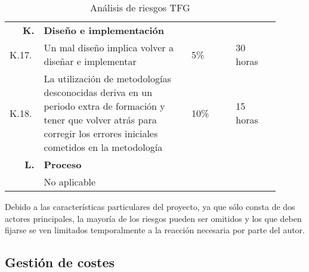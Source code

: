 \begin{table}[H]
\begin{tabular}{p{0.1\linewidth}p{0.5\linewidth}p{0.15\linewidth}p{0.15\linewidth}}
		\multicolumn{1}{r}{\cellcolor{black!30}\textbf{K. }} &
		\multicolumn{3}{l}{\cellcolor{black!30}\textbf{Diseño e implementación}}\\
		K.17. &Un mal diseño implica volver a diseñar e implementar							&	5\%		&	30 horas\\
		K.18. &La utilización de metodologías desconocidas deriva en un periodo extra de formación y tener que volver atrás para corregir los errores iniciales cometidos en la metodología										&	10\%	&	15 horas\\
		
		\multicolumn{1}{r}{\cellcolor{black!30}\textbf{L. }} &
		\multicolumn{3}{l}{\cellcolor{black!30}\textbf{Proceso}}\\	
		&No aplicable&&\\
	    \hline
	  \end{tabular}
	  \caption{Análisis de riesgos \ac{TFG}}
	  \label{tab:riesgos}
	\end{table}
	
	Debido a las características particulares del proyecto, ya que sólo consta de dos actores principales, la mayoría de los riesgos pueden ser omitidos y los que deben fijarse se ven limitados temporalmente a la reacción necesaria por parte del autor.
	
	\subsection{Gestión de costes}
	
	

